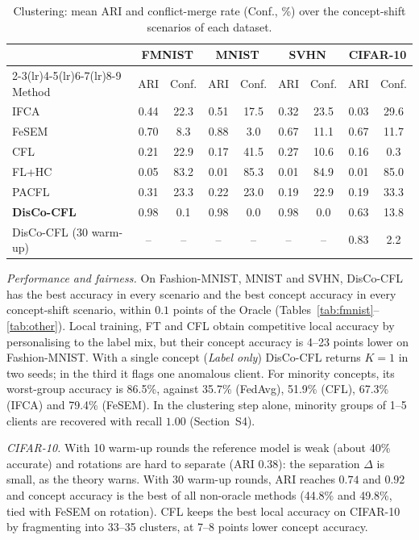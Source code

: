 \documentclass[journal]{IEEEtran}
\theoremstyle{definition}
\begin{document}
\begin{table}[t]
\centering
\caption{Clustering: mean ARI and conflict-merge rate (Conf., \%) over the concept-shift scenarios of each dataset.}\label{tab:cluster}
\scriptsize\setlength{\tabcolsep}{2.5pt}
\begin{tabular}{lcccccccc}
\toprule
 & \multicolumn{2}{c}{FMNIST} & \multicolumn{2}{c}{MNIST} & \multicolumn{2}{c}{SVHN} & \multicolumn{2}{c}{CIFAR-10} \\
\cmidrule(lr){2-3}\cmidrule(lr){4-5}\cmidrule(lr){6-7}\cmidrule(lr){8-9}
Method & ARI & Conf. & ARI & Conf. & ARI & Conf. & ARI & Conf. \\
\midrule
IFCA & 0.44 & 22.3 & 0.51 & 17.5 & 0.32 & 23.5 & 0.03 & 29.6 \\
FeSEM & 0.70 & 8.3 & 0.88 & 3.0 & 0.67 & 11.1 & 0.67 & 11.7 \\
CFL & 0.21 & 22.9 & 0.17 & 41.5 & 0.27 & 10.6 & 0.16 & 0.3 \\
FL+HC & 0.05 & 83.2 & 0.01 & 85.3 & 0.01 & 84.9 & 0.01 & 85.0 \\
PACFL & 0.31 & 23.3 & 0.22 & 23.0 & 0.19 & 22.9 & 0.19 & 33.3 \\
\textbf{DisCo-CFL} & 0.98 & 0.1 & 0.98 & 0.0 & 0.98 & 0.0 & 0.63 & 13.8 \\
DisCo-CFL (30 warm-up) & -- & -- & -- & -- & -- & -- & 0.83 & 2.2 \\
\bottomrule
\end{tabular}
\end{table}

\emph{Performance and fairness.} On Fashion-MNIST, MNIST and SVHN, DisCo-CFL has the best accuracy in every scenario and the best concept accuracy in every concept-shift scenario, within $0.1$ points of the Oracle (Tables~\ref{tab:fmnist}--\ref{tab:other}). Local training, FT and CFL obtain competitive local accuracy by personalising to the label mix, but their concept accuracy is 4--23 points lower on Fashion-MNIST. With a single concept (\emph{Label only}) DisCo-CFL returns $K=1$ in two seeds; in the third it flags one anomalous client. For minority concepts, its worst-group accuracy is 86.5\%, against 35.7\% (FedAvg), 51.9\% (CFL), 67.3\% (IFCA) and 79.4\% (FeSEM). In the clustering step alone, minority groups of 1--5 clients are recovered with recall $1.00$ (Section~S4).

\emph{CIFAR-10.} With 10 warm-up rounds the reference model is weak (about 40\% accurate) and rotations are hard to separate (ARI $0.38$): the separation $\Delta$ is small, as the theory warns. With 30 warm-up rounds, ARI reaches $0.74$ and $0.92$ and concept accuracy is the best of all non-oracle methods (44.8\% and 49.8\%, tied with FeSEM on rotation). CFL keeps the best local accuracy on CIFAR-10 by fragmenting into 33--35 clusters, at 7--8 points lower concept accuracy.
\end{document}
